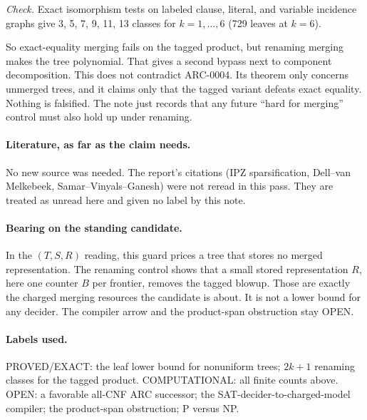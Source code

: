 \documentclass[11pt]{article}
\begin{document}
\emph{Check.} Exact isomorphism tests on labeled clause, literal, and variable incidence graphs give 3, 5, 7, 9, 11, 13 classes for $k=1,\dots,6$ (729 leaves at $k=6$).

So exact-equality merging fails on the tagged product, but renaming merging makes the tree polynomial. That gives a second bypass next to component decomposition. This does not contradict ARC-0004. Its theorem only concerns unmerged trees, and it claims only that the tagged variant defeats exact equality. Nothing is falsified. The note just records that any future ``hard for merging'' control must also hold up under renaming.

\paragraph{Literature, as far as the claim needs.} No new source was needed. The report's citations (IPZ sparsification, Dell--van Melkebeek, Samar--Vinyals--Ganesh) were not reread in this pass. They are treated as unread here and given no label by this note.

\paragraph{Bearing on the standing candidate.} In the $(T,S,R)$ reading, this guard prices a tree that stores no merged representation. The renaming control shows that a small stored representation $R$, here one counter $B$ per frontier, removes the tagged blowup. Those are exactly the charged merging resources the candidate is about. It is not a lower bound for any decider. The compiler arrow and the product-span obstruction stay OPEN.

\paragraph{Labels used.} PROVED/EXACT: the leaf lower bound for nonuniform trees; $2k+1$ renaming classes for the tagged product. COMPUTATIONAL: all finite counts above. OPEN: a favorable all-CNF ARC successor; the SAT-decider-to-charged-model compiler; the product-span obstruction; P versus NP.
\end{document}
